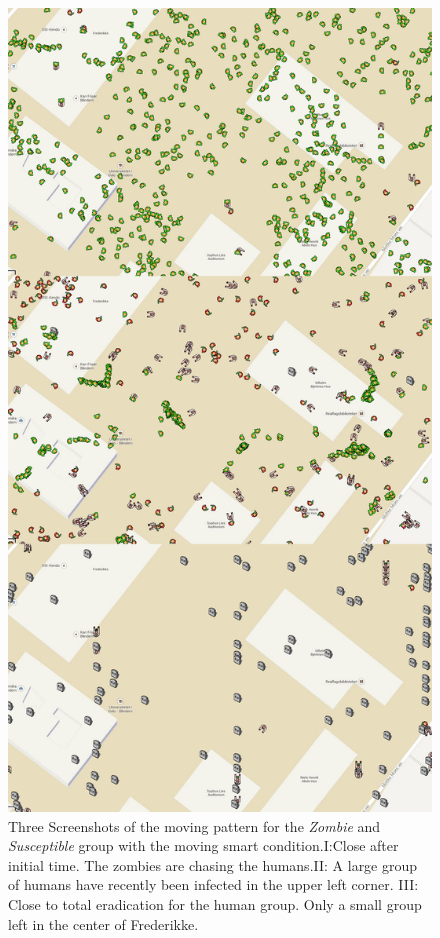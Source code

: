 \documentclass[%
twoside,                 %
final,                   %
chapterprefix=true,      %
open=right               %
10pt]{book}
\begin{document}
\begin{figure}[ht]
  \centerline{\includegraphics[width=0.8\linewidth]{3_fig/screenshots_moving_smart.png}}
  \caption{
  \label{fig:screenshot_moving_smart} Three Screenshots of the moving pattern for the \emph{Zombie} and \emph{Susceptible} group with the moving smart condition.I:Close after initial time. The zombies are chasing the humans.II: A large group of humans have recently been infected in the upper left corner. III: Close to total eradication for the human group. Only a small group left in the center of Frederikke.
  }
\end{figure}
\end{document}
